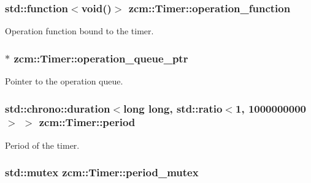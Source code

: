\hypertarget{classzcm_1_1Timer_a07f820c2d67029b83547bbfd77fc3690}{
\subsubsection[{operation\-\_\-function}]{\setlength{\rightskip}{0pt plus 5cm}std\-::function$<$void()$>$ zcm\-::\-Timer\-::operation\-\_\-function\hspace{0.3cm}{\ttfamily [private]}}}\label{classzcm_1_1Timer_a07f820c2d67029b83547bbfd77fc3690}


Operation function bound to the timer. 

\hypertarget{classzcm_1_1Timer_a9f2ce34fb9230c4251355fde956b7220}{
\subsubsection[{operation\-\_\-queue\-\_\-ptr}]{$\ast$ zcm\-::\-Timer\-::operation\-\_\-queue\-\_\-ptr\hspace{0.3cm}{\ttfamily [private]}}}\label{classzcm_1_1Timer_a9f2ce34fb9230c4251355fde956b7220}


Pointer to the operation queue. 

\hypertarget{classzcm_1_1Timer_a36c7498a7ad5706ceca83429e6c1759c}{
\subsubsection[{period}]{\setlength{\rightskip}{0pt plus 5cm}std\-::chrono\-::duration$<$long long, std\-::ratio$<$1, 1000000000$>$ $>$ zcm\-::\-Timer\-::period\hspace{0.3cm}{\ttfamily [private]}}}\label{classzcm_1_1Timer_a36c7498a7ad5706ceca83429e6c1759c}


Period of the timer. 

\hypertarget{classzcm_1_1Timer_af9d6ce4df403e44b543241926ddcf41f}{
\subsubsection[{period\-\_\-mutex}]{\setlength{\rightskip}{0pt plus 5cm}std\-::mutex zcm\-::\-Timer\-::period\-\_\-mutex\hspace{0.3cm}{\ttfamily [private]}}}\label{classzcm_1_1Timer_af9d6ce4df403e44b543241926ddcf41f}


